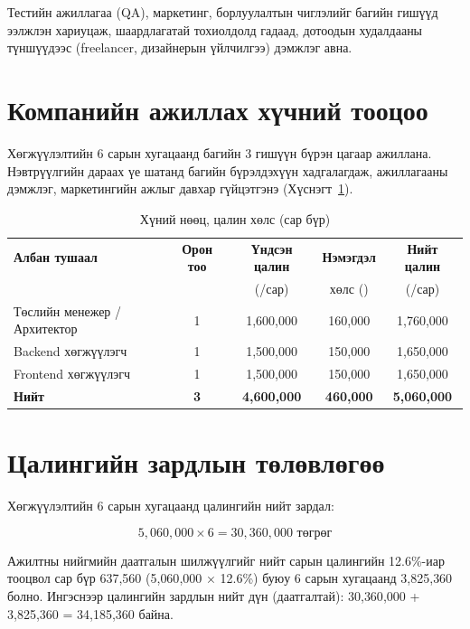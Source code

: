 Тестийн ажиллагаа (QA), маркетинг, борлуулалтын чиглэлийг багийн
гишүүд ээлжлэн хариуцаж, шаардлагатай тохиолдолд гадаад, дотоодын
худалдааны түншүүдээс (freelancer, дизайнерын үйлчилгээ)
дэмжлэг авна.

\section{Компанийн ажиллах хүчний тооцоо}

Хөгжүүлэлтийн 6 сарын хугацаанд багийн 3 гишүүн бүрэн цагаар
ажиллана. Нэвтрүүлгийн дараах үе шатанд багийн бүрэлдэхүүн
хадгалагдаж, ажиллагааны дэмжлэг, маркетингийн ажлыг давхар
гүйцэтгэнэ (Хүснэгт~\ref{tab:ch4-hunii-nuuts}).

\begin{table}[h]
  \centering
  \caption{Хүний нөөц, цалин хөлс (сар бүр)}
  \label{tab:ch4-hunii-nuuts}
  \small
  \begin{tabular}{@{}p{4.0cm}cccc@{}}
    \toprule
    \textbf{Албан тушаал} & \textbf{Орон тоо} & \textbf{Үндсэн цалин} &
    \textbf{Нэмэгдэл} & \textbf{Нийт цалин} \\
    & & (\textcurrency{}/сар) & хөлс (\textcurrency{}) & (\textcurrency{}/сар) \\
    \midrule
    Төслийн менежер / Архитектор & 1 & 1{,}600{,}000 & 160{,}000 & 1{,}760{,}000 \\
    Backend хөгжүүлэгч & 1 & 1{,}500{,}000 & 150{,}000 & 1{,}650{,}000 \\
    Frontend хөгжүүлэгч & 1 & 1{,}500{,}000 & 150{,}000 & 1{,}650{,}000 \\
    \midrule
    \textbf{Нийт} & \textbf{3} & \textbf{4{,}600{,}000} &
    \textbf{460{,}000} & \textbf{5{,}060{,}000} \\
    \bottomrule
  \end{tabular}
\end{table}

\section{Цалингийн зардлын төлөвлөгөө}

Хөгжүүлэлтийн 6 сарын хугацаанд цалингийн нийт зардал:

\begin{equation}
  5{,}060{,}000 \times 6 = 30{,}360{,}000 \text{ төгрөг}
\end{equation}

Ажилтны нийгмийн даатгалын шилжүүлгийг нийт сарын цалингийн
12.6\%-иар тооцвол сар бүр 637{,}560\textcurrency{} (5{,}060{,}000 × 12.6\%)
буюу 6 сарын хугацаанд 3{,}825{,}360\textcurrency{} болно. Ингэснээр
цалингийн зардлын нийт дүн (даатгалтай): 30{,}360{,}000 + 3{,}825{,}360 =
34{,}185{,}360\textcurrency{} байна.

